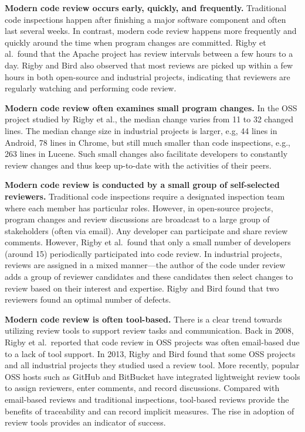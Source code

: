 \documentclass[runningheads,a4paper]{llncs}
\begin{document}
{\bf Modern code review occurs early, quickly, and frequently.} Traditional code inspections happen after finishing a major software component and often last several weeks. In contrast, modern code review happens more frequently and quickly around the time when program changes are committed. Rigby et al.~found that the Apache project has review intervals between a few hours to a day. Rigby and Bird also observed that most reviews are picked up within a few hours in both open-source and industrial projects, indicating that reviewers are regularly watching and performing code review.

{\bf Modern code review often examines small program changes.} In the OSS project studied by Rigby et al., the median change varies from 11 to 32 changed lines. The median change size in industrial projects is larger, e.g, 44 lines in Android, 78 lines in Chrome, but still much smaller than code inspections, e.g., 263 lines in Lucene. Such small changes also facilitate developers to constantly review changes and thus keep up-to-date with the activities of their peers. 

{\bf Modern code review is conducted by a small group of self-selected reviewers.} Traditional code inspections require a designated inspection team where each member has particular roles. However, in open-source projects, program changes and review discussions are broadcast to a large group of stakeholders (often via email). Any developer can participate and share review comments. However, Rigby et al.~found that only a small number of developers (around 15) periodically participated into code review. In industrial projects, reviews are assigned in a mixed manner---the author of the code under review adds a group of reviewer candidates and these candidates then select changes to review based on their interest and expertise. Rigby and Bird found that two reviewers found an optimal number of defects.

{\bf Modern code review is often tool-based.} There is a clear trend towards utilizing review tools to support review tasks and communication. Back in 2008, Rigby et al.~reported that code review in OSS projects was often email-based due to a lack of tool support. In 2013, Rigby and Bird found that some OSS projects and all industrial projects they studied used a review tool. More recently, popular OSS hosts such as GitHub and BitBucket have integrated lightweight review tools to assign reviewers, enter comments, and record discussions. Compared with email-based reviews and traditional inspections, tool-based reviews provide the benefits of traceability and can record implicit measures. The rise in adoption of review tools provides an indicator of success.
\end{document}
